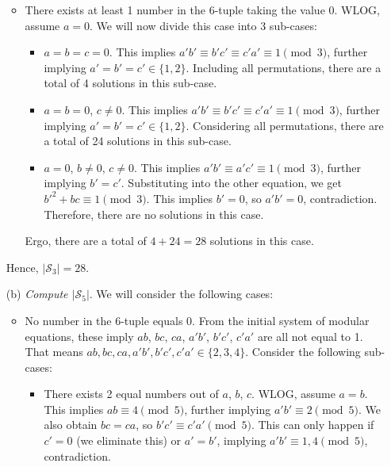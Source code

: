 \documentclass[11pt]{article}
\begin{document}
\begin{solution}
\begin{enumerate}
\begin{itemize}
                    \item There exists at least 1 number in the 6-tuple taking the value 0. WLOG, assume \(a = 0\). We will now divide this case into 3 sub-cases:

                    \begin{itemize}
                        \item \(a = b = c = 0\). This implies \(a'b' \equiv b'c' \equiv c'a' \equiv 1 \pmod3\), further implying \(a' = b' = c' \in \{1,2\}\). Including all permutations, there are a total of 4 solutions in this sub-case.

                        \item \(a = b = 0\), \(c \neq 0\). This implies \(a'b' \equiv b'c' \equiv c'a' \equiv 1 \pmod3\), further implying \(a' = b' = c' \in \{1,2\}\). Considering all permutations, there are a total of 24 solutions in this sub-case.

                        \item \(a = 0\), \(b \neq 0\), \(c \neq 0\). This implies \(a'b' \equiv a'c' \equiv 1 \pmod3\), further implying \(b' = c'\). Substituting into the other equation, we get \(b'^2 + bc \equiv 1 \pmod3\). This implies \(b' = 0\), so \(a'b' = 0\), contradiction. Therefore, there are no solutions in this case.
                    \end{itemize}

                    Ergo, there are a total of \(4 + 24 = 28\) solutions in this case.
                \end{itemize}

                Hence, \(\left|\mathcal{S}_{3}\right| = 28\).

                \item[(b)] \textit{Compute \(\left|\mathcal{S}_{5}\right|\)}. We will consider the following cases:

                \begin{itemize}
                    \item No number in the 6-tuple equals 0. From the initial system of modular equations, these imply \(ab\), \(bc\), \(ca\), \(a'b'\), \(b'c'\), \(c'a'\) are all not equal to 1. That means \(ab,bc,ca,a'b',b'c',c'a' \in \{2,3,4\}\). Consider the following sub-cases:

                    \begin{itemize}
                        \item There exists 2 equal numbers out of \(a\), \(b\), \(c\). WLOG, assume \(a = b\). This implies \(ab \equiv 4 \pmod5\), further implying \(a'b' \equiv 2 \pmod5\). We also obtain \(bc = ca\), so \(b'c' \equiv c'a' \pmod5\). This can only happen if \(c' = 0\) (we eliminate this) or \(a' = b'\), implying \(a'b' \equiv 1,4 \pmod5\), contradiction.


\end{itemize}
\end{itemize}
\end{enumerate}
\end{solution}
\end{document}
